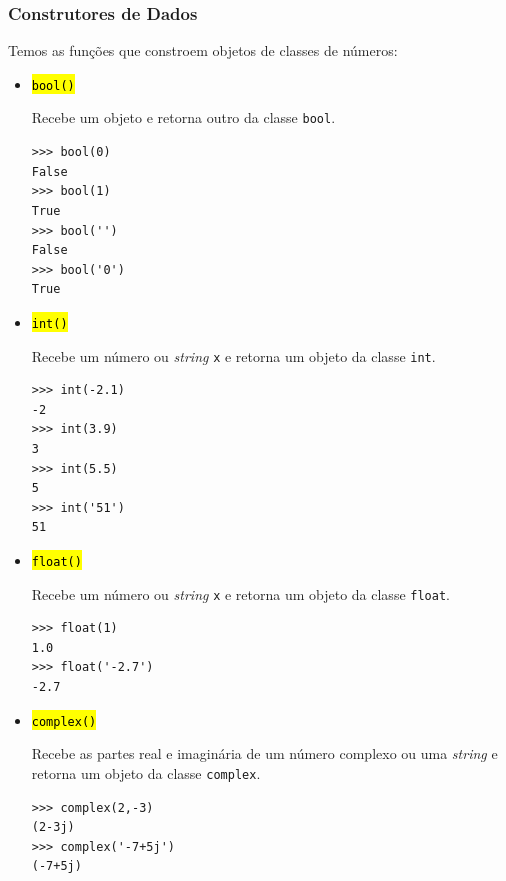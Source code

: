 \subsubsection{Construtores de Dados}

Temos as funções que constroem objetos de classes de números:
\begin{itemize}

\item \hl{{\lstinline+bool()+}}

  Recebe um objeto e retorna outro da classe \lstinline+bool+.

\begin{lstlisting}
>>> bool(0)
False
>>> bool(1)
True
>>> bool('')
False
>>> bool('0')
True
\end{lstlisting}
  
\item \hl{{\lstinline+int()+}}

  Recebe um número ou \textit{string} \lstinline+x+ e retorna um objeto da classe \lstinline+int+.

\begin{lstlisting}
>>> int(-2.1)
-2
>>> int(3.9)
3
>>> int(5.5)
5
>>> int('51')
51
\end{lstlisting}

\item \hl{{\lstinline+float()+}}

  Recebe um número ou \textit{string} \lstinline+x+ e retorna um objeto da classe \lstinline+float+.

\begin{lstlisting}
>>> float(1)
1.0
>>> float('-2.7')
-2.7
\end{lstlisting}

\item \hl{{\lstinline+complex()+}}

  Recebe as partes real e imaginária de um número complexo ou uma \textit{string} e retorna um objeto da classe \lstinline+complex+.

\begin{lstlisting}
>>> complex(2,-3)
(2-3j)
>>> complex('-7+5j')
(-7+5j)
\end{lstlisting}
\end{itemize}

